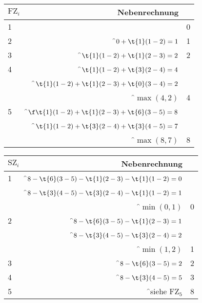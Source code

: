 \documentclass{lehramt-informatik}
\begin{document}
\begin{enumerate}
\begin{antwort}
%


\begin{tabular}{|l|r|r|}
\hline
$\text{FZ}_i$ & Nebenrechnung & \\
\hline\hline
1             &                               & 0 \\\hline
2             & \f$0 + \t{1}(1-2) = 1$          & 1 \\\hline
3             & \f$\t{1}(1-2) + \t{1}(2-3) = 2$ & 2 \\\hline
4             & \f$\t{1}(1-2) + \t{3}(2-4) = 4$ &  \\
              & \f$\t{1}(1-2) + \t{1}(2-3) + \t{0}(3-4) = 2$ & \\
              & \f$\max(4,2)$                   & 4 \\\hline

5             & \f$\f\t{1}(1-2) + \t{1}(2-3) + \t{6}(3-5) = 8$ & \\
              & \f$\t{1}(1-2) + \t{3}(2-4) + \t{3}(4-5) = 7$ & \\
              & \f$\max(8,7)$                   & 8 \\\hline

\end{tabular}

%


\begin{tabular}{|l|r|r|}
\hline
$\text{SZ}_i$ & Nebenrechnung & \\
\hline\hline
1             & \f$8 - \t{6}(3-5) - \t{1}(2-3) - \t{1}(1-2) = 0$ & \\
              & \f$8 - \t{3}(4-5) - \t{3}(2-4) - \t{1}(1-2) = 1$ & \\
              & \f$\min(0,1)$ & 0 \\\hline

2             & \f$8 - \t{6}(3-5) - \t{1}(2-3) = 1$ & \\
              & \f$8 - \t{3}(4-5) - \t{3}(2-4) = 2$ & \\
              & \f$\min(1,2)$ & 1 \\\hline

3             & \f$8 - \t{6}(3-5) = 2$ & 2  \\\hline

4             & \f$8 - \t{3}(4-5) = 5$      & 3 \\\hline
5             & \f{}siehe $\text{FZ}_5$  & 8 \\\hline
\end{tabular}
\end{antwort}


\end{enumerate}
\end{document}
